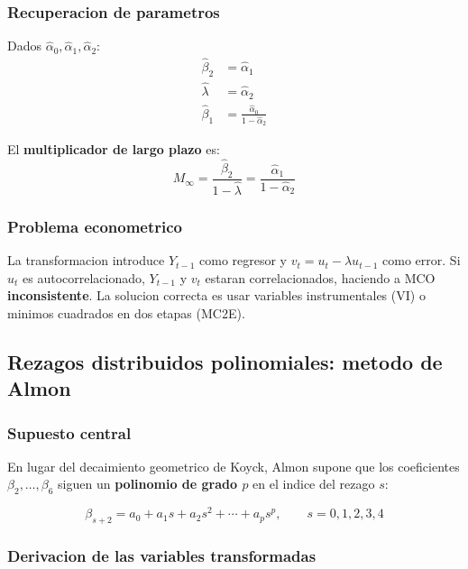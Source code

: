 \documentclass[12pt, letterpaper]{article}
\theoremstyle{remark}
\begin{document}
\subsubsection{Recuperacion de parametros}

Dados $\hat\alpha_0, \hat\alpha_1, \hat\alpha_2$:
\begin{align}
  \hat\beta_2 &= \hat\alpha_1\\
  \hat\lambda &= \hat\alpha_2\\
  \hat\beta_1 &= \frac{\hat\alpha_0}{1-\hat\alpha_2}
\end{align}

El \textbf{multiplicador de largo plazo} es:
\begin{equation}
  M_{\infty} = \frac{\hat\beta_2}{1-\hat\lambda} = \frac{\hat\alpha_1}{1-\hat\alpha_2}
  \label{eq:mult_LP}
\end{equation}

\subsubsection{Problema econometrico}

La transformacion introduce $Y_{t-1}$ como regresor y $v_t = u_t - \lambda u_{t-1}$
como error. Si $u_t$ es autocorrelacionado, $Y_{t-1}$ y $v_t$ estaran
correlacionados, haciendo a MCO \textbf{inconsistente}. La solucion correcta
es usar variables instrumentales (VI) o minimos cuadrados en dos etapas (MC2E).

\subsection{Rezagos distribuidos polinomiales: metodo de Almon}

\subsubsection{Supuesto central}

En lugar del decaimiento geometrico de Koyck, Almon supone que los coeficientes
$\beta_2, \ldots, \beta_6$ siguen un \textbf{polinomio de grado $p$} en el
indice del rezago $s$:

\begin{equation}
  \beta_{s+2} = a_0 + a_1 s + a_2 s^2 + \cdots + a_p s^p,
  \qquad s = 0, 1, 2, 3, 4
  \label{eq:almon_supuesto}
\end{equation}

\subsubsection{Derivacion de las variables transformadas}
\end{document}
